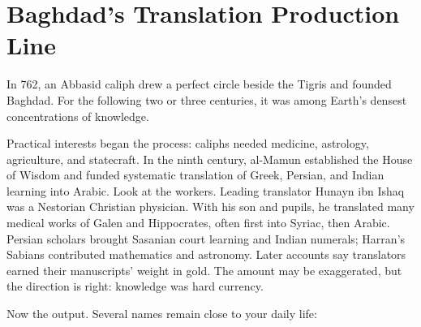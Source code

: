 \section{Baghdad's Translation Production Line}
In 762, an Abbasid caliph drew a perfect circle beside the Tigris and founded Baghdad. For the following two or three centuries, it was among Earth's densest concentrations of knowledge.

Practical interests began the process: caliphs needed medicine, astrology, agriculture, and statecraft. In the ninth century, al-Mamun established the House of Wisdom and funded systematic translation of Greek, Persian, and Indian learning into Arabic. Look at the workers. Leading translator Hunayn ibn Ishaq was a Nestorian Christian physician. With his son and pupils, he translated many medical works of Galen and Hippocrates, often first into Syriac, then Arabic. Persian scholars brought Sasanian court learning and Indian numerals; Harran's Sabians contributed mathematics and astronomy. Later accounts say translators earned their manuscripts' weight in gold. The amount may be exaggerated, but the direction is right: knowledge was hard currency.

Now the output. Several names remain close to your daily life:

